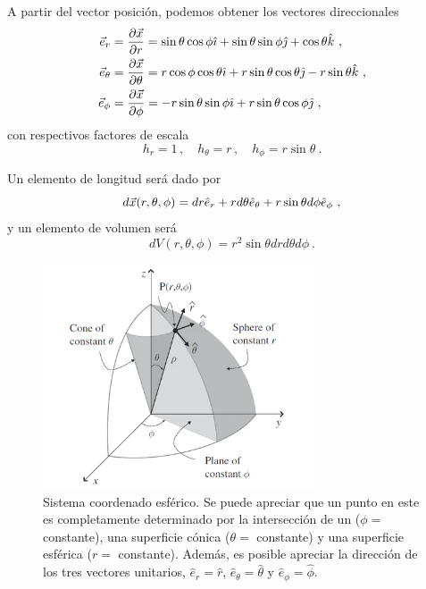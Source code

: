 A partir del vector posición, podemos obtener los vectores direccionales 
\begin{align}
    \vec{e}_r & = \frac{\partial \x}{\partial r} = \sin \theta \cos \phi \hat{\imath} + \sin \theta \sin \phi \hat{\jmath} + \cos \theta \hat{k} \ , \\
    \vec{e}_\theta & = \frac{\partial \x}{\partial \theta} = r \cos \phi \cos \theta \hat{\imath} + r \sin \theta \cos \theta \hat{\jmath} - r \sin \theta \hat{k} \ , \\
    \vec{e}_\phi & = \frac{\partial \x}{\partial \phi} = -r \sin \theta \sin \phi  \hat{\imath} + r \sin \theta \cos \phi \hat{\jmath} \ ,
\end{align}
con respectivos factores de escala 
\begin{equation}
    h_r = 1 \, , \quad h_\theta = r \, , \quad h_\phi = r \sin \theta \ .
\end{equation}

Un elemento de longitud será dado por 
\begin{equation}
    d\vec{x}(r, \theta, \phi) = dr \hat{e}_r + r d\theta \hat{e}_\theta + r \sin \theta d\phi \hat{e}_\phi \ ,
\end{equation}
y un elemento de volumen será
\begin{equation}
    dV(r, \theta, \phi) = r^2 \sin \theta dr d\theta d\phi \ .
\end{equation}

\begin{figure}[htbp]
    \centering
    \includegraphics[width=8cm]{Figuras/Lineas-coordenadas-esfericas.png}
    \caption{Sistema coordenado esférico. Se puede apreciar que un punto en este es completamente determinado por la intersección de un ($\phi = $ constante), una superficie cónica ($\theta = $ constante) y una superficie esférica ($r = $ constante). Además, es posible apreciar la dirección de los tres vectores unitarios, $\hat{e}_r = \hat{r}$, $\hat{e}_\theta = \hat{\theta}$ y $\hat{e}_\phi = \hat{\phi}$.}
\end{figure}


